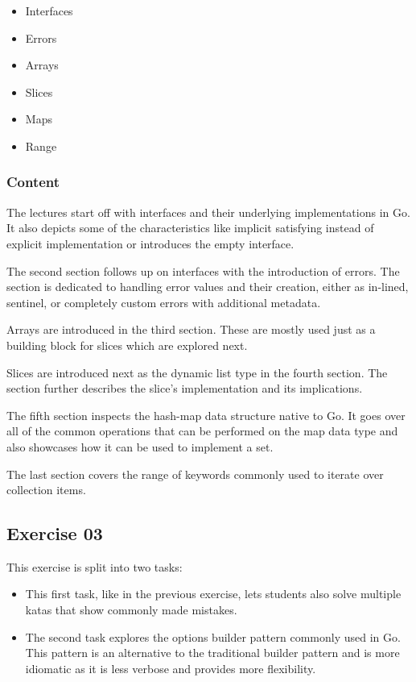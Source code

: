 \documentclass[
  digital,
  color,
  oneside,
  nosansbold,
  nocolorbold,
  nolof,
  nolot,
]{fithesis4}
\begin{document}
\begin{itemize}
    \item Interfaces
    \item Errors
    \item Arrays
    \item Slices
    \item Maps
    \item Range
\end{itemize}

\subsubsection{Content}

The lectures start off with interfaces and their underlying implementations in Go. It also depicts some of the characteristics like implicit satisfying instead of explicit implementation or introduces the empty interface.

The second section follows up on interfaces with the introduction of errors. The section is dedicated to handling error values and their creation, either as in-lined, sentinel, or completely custom errors with additional metadata.

Arrays are introduced in the third section. These are mostly used just as a building block for slices which are explored next.

Slices are introduced next as the dynamic list type in the fourth section. The section further describes the slice's implementation and its implications.

The fifth section inspects the hash-map data structure native to Go. It goes over all of the common operations that can be performed on the map data type and also showcases how it can be used to implement a set. 

The last section covers the range of keywords commonly used to iterate over collection items.

\subsection{Exercise 03}

This exercise is split into two tasks:
\begin{itemize}
    \item This first task, like in the previous exercise, lets students also solve multiple katas that show commonly made mistakes.
    \item The second task explores the options builder pattern commonly used in Go. This pattern is an alternative to the traditional builder pattern and is more idiomatic as it is less verbose and provides more flexibility.
\end{itemize}
\end{document}

